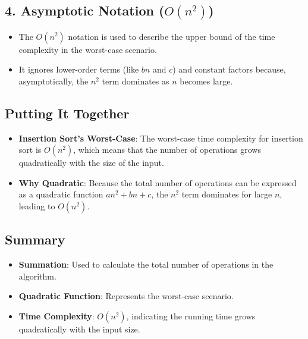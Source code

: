 \documentclass{article}
\begin{document}
\subsection*{4. Asymptotic Notation (\(O(n^2)\))}
\begin{itemize}
    \item The \(O(n^2)\) notation is used to describe the upper bound of the time complexity in the worst-case scenario.
    \item It ignores lower-order terms (like \(bn\) and \(c\)) and constant factors because, asymptotically, the \(n^2\) term dominates as \(n\) becomes large.
\end{itemize}

\subsection*{Putting It Together}
\begin{itemize}
    \item \textbf{Insertion Sort's Worst-Case}: The worst-case time complexity for insertion sort is \(O(n^2)\), which means that the number of operations grows quadratically with the size of the input.
    \item \textbf{Why Quadratic}: Because the total number of operations can be expressed as a quadratic function \(an^2 + bn + c\), the \(n^2\) term dominates for large \(n\), leading to \(O(n^2)\).
\end{itemize}

\subsection*{Summary}
\begin{itemize}
    \item \textbf{Summation}: Used to calculate the total number of operations in the algorithm.
    \item \textbf{Quadratic Function}: Represents the worst-case scenario.
    \item \textbf{Time Complexity}: \(O(n^2)\), indicating the running time grows quadratically with the input size.
\end{itemize}
\end{document}
